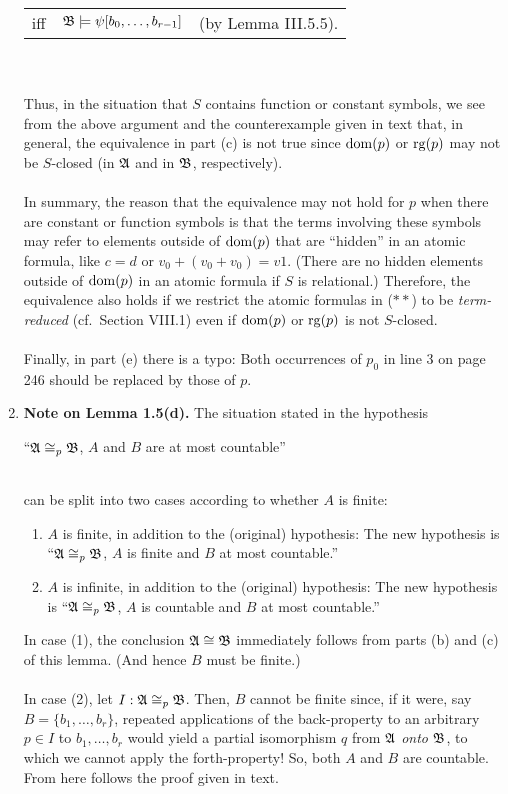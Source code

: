 \begin{enumerate}[1.]
\begin{tabular}{lll}
iff & $\mathfrak{B} \models \psi [{b}_{0}, \ldots, {b}_{r - 1}]$ & (by Lemma III.5.5).
\end{tabular}\\
\ \\
Thus, in the situation that $S$ contains function or constant symbols, we see from the above argument and the counterexample given in text that, in general, the equivalence in part (c) is not true since ${\mathrm{dom}(p)}$ or ${\mathrm{rg}(p)}$ may not be $S$-closed (in $\mathfrak{A}$ and in $\mathfrak{B}$, respectively).\\
\ \\
In summary, the reason that the equivalence may not hold for $p$ when there are constant or function symbols is that the terms involving these symbols may refer to elements outside of ${\mathrm{dom}(p)}$ that are ``hidden'' in an atomic formula, like $c \equal d$ or $v_0 + (v_0 + v_0) \equal v1$. (There are no hidden elements outside of ${\mathrm{dom}(p)}$ in an atomic formula if $S$ is relational.) Therefore, the equivalence also holds if we restrict the atomic formulas in ($\ast\ast$) to be \emph{term-reduced} (cf.\ Section VIII.1) even if ${\mathrm{dom}(p)}$ or ${\mathrm{rg}(p)}$ is not $S$-closed.\\
\ \\
Finally, in part (e) there is a typo: Both occurrences of $p_0$ in line 3 on page 246 should be replaced by those of $p$.
%
\item \textbf{Note on Lemma 1.5(d).} The situation stated in the hypothesis\\
\centerline{``$\mathfrak{A} \cong_\mathit{p} \mathfrak{B}$, $A$ and $B$ are at most countable''}\\
can be split into two cases according to whether $A$ is finite:
\begin{enumerate}[(1)]
\item $A$ is finite, in addition to the (original) hypothesis: The new hypothesis is ``$\mathfrak{A} \cong_\mathit{p} \mathfrak{B}$, $A$ is finite and $B$ at most countable.''
\item $A$ is infinite, in addition to the (original) hypothesis: The new hypothesis is ``$\mathfrak{A} \cong_\mathit{p} \mathfrak{B}$, $A$ is countable and $B$ at most countable.''
\end{enumerate}
In case (1), the conclusion $\mathfrak{A} \cong \mathfrak{B}$ immediately follows from parts (b) and (c) of this lemma. (And hence $B$ must be finite.)\\
\ \\
In case (2), let $I: \mathfrak{A} \cong_\mathit{p} \mathfrak{B}$. Then, $B$ cannot be finite since, if it were, say $B = \{ b_1, \ldots, b_r \}$, repeated applications of the back-property to an arbitrary $p \in I$ to $b_1, \ldots, b_r$ would yield a partial isomorphism $q$ from $\mathfrak{A}$ \emph{onto} $\mathfrak{B}$, to which we cannot apply the forth-property! So, both $A$ and $B$ are countable. From here follows the proof given in text.

\end{enumerate}
